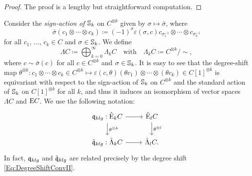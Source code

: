\documentclass[\MainFolder/Text.tex]{subfiles}
\begin{document}
\begin{proof}
The proof is a lengthy but straightforward computation.
\end{proof}

Consider the \emph{sign-action of $\mathbb{S}_k$} on $C^{\otimes k}$ given by $\sigma \mapsto \bar{\sigma}$, where 
$$ \bar{\sigma}(c_1\otimes\dotsb\otimes c_k)\coloneqq(-1)^\sigma\varepsilon(\sigma,c)c_{\sigma_1^{-1}}\otimes\dotsb\otimes c_{\sigma_k^{-1}} $$
for all $c_1$, $\dotsc$, $c_k\in C$ and $\sigma\in \mathbb{S}_k$. We define 
$$ \Lambda C \coloneqq \bigoplus_{k=0}^\infty \Lambda_k C\quad\text{with}\quad \Lambda_k C \coloneqq C^{\otimes k}/\sim, $$
where $c\sim \bar{\sigma}(c)$ for all $c\in C^{\otimes k}$ and $\sigma\in \mathbb{S}_k$. It is easy to see that the degree-shift map $\theta^{\otimes k}: c_1\otimes \dotsb \otimes c_k \in C^{\otimes k} \mapsto \varepsilon(c,\theta)(\theta c_1)\otimes\dotsb\otimes(\theta c_k)\in C[1]^{\otimes k}$ is equivariant with respect to the sign-action of $\mathbb{S}_k$ on $C^{\otimes k}$ and the standard action of $\mathbb{S}_k$ on $C[1]^{\otimes k}$ for all $k$, and thus it induces an isomorphism of vector spaces $\Lambda C$ and $\mathrm{E} C$. We use the following notation:
$$\begin{tikzcd}
 \OPQ_{klg}: \hat{\Ext}_k C \arrow{r} \arrow{d}{\theta^{\otimes k}} & \hat{\Ext}_l C \arrow{d}{\theta^{\otimes l}} \\
 \tilde{\OPQ}_{klg}: \hat{\Lambda}_k C \arrow{r} & \hat{\Lambda}_l C.
\end{tikzcd}$$
In fact, $\mathfrak{q}_{klg}$ and $\tilde{\mathfrak{q}}_{klg}$ are related precisely by the degree shift \eqref{Eq:DegreeShiftConvII}. 
\end{document}
